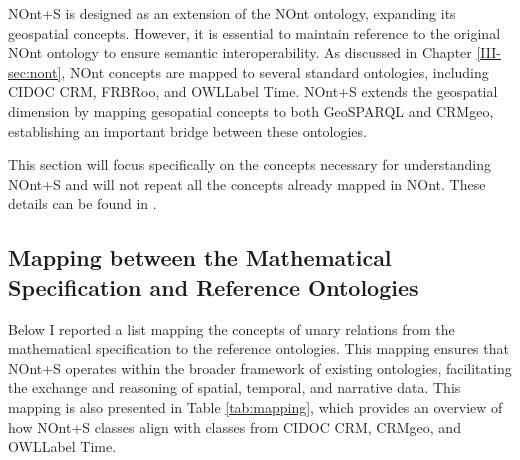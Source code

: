 NOnt+S is designed as an extension of the NOnt ontology, expanding its geospatial concepts. However, it is essential to maintain reference to the original NOnt ontology to ensure semantic interoperability. As discussed in Chapter \ref{III-sec:nont}, NOnt concepts are mapped to several standard ontologies, including CIDOC CRM, FRBRoo, and \acrshort{OWLLabel} Time. NOnt+S extends the geospatial dimension by mapping gesopatial concepts to both GeoSPARQL and CRMgeo, establishing an important bridge between these ontologies.

This section will focus specifically on the concepts necessary for understanding NOnt+S and will not repeat all the concepts already mapped in NOnt. These details can be found in \cite{meghiniRepresentingNarrativesDigital2021}. 

\subsection{Mapping between the Mathematical Specification and Reference Ontologies}\label{V-subsec:mappingMathematicalReference}

Below I reported a list mapping the concepts of unary relations from the mathematical specification to the reference ontologies. This mapping ensures that NOnt+S operates within the broader framework of existing ontologies, facilitating the exchange and reasoning of spatial, temporal, and narrative data. This mapping is also presented in Table \ref{tab:mapping}, which provides an overview of how NOnt+S classes align with classes from CIDOC CRM, CRMgeo, and \acrshort{OWLLabel} Time.

